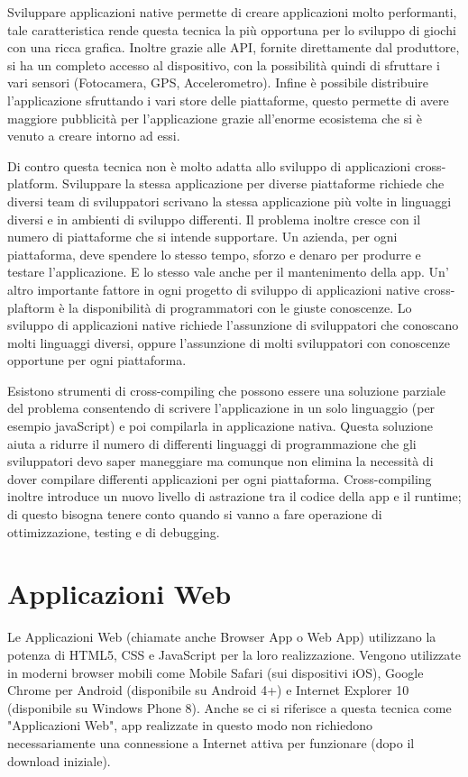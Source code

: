 Sviluppare applicazioni native permette di creare applicazioni molto performanti, tale caratteristica rende questa tecnica la più opportuna per lo sviluppo di giochi con una ricca grafica. Inoltre grazie alle API, fornite direttamente dal produttore, si ha un completo accesso al dispositivo, con la possibilità quindi di sfruttare i vari sensori (Fotocamera, GPS, Accelerometro). Infine è possibile distribuire l'applicazione sfruttando i vari store delle piattaforme, questo permette di avere maggiore pubblicità per l'applicazione grazie all'enorme ecosistema che si è venuto a creare intorno ad essi.

Di contro questa tecnica non è molto adatta allo sviluppo di applicazioni cross-platform. Sviluppare la stessa applicazione per diverse piattaforme richiede che diversi team di sviluppatori scrivano la stessa applicazione più volte in linguaggi diversi e in ambienti di sviluppo differenti.
Il problema inoltre cresce con il numero di piattaforme che si intende supportare. Un azienda, per ogni piattaforma, deve spendere lo stesso tempo, sforzo e denaro per produrre e testare l'applicazione. E lo stesso vale anche per il mantenimento della app.
Un' altro importante fattore in ogni progetto di sviluppo di applicazioni native cross-plaftorm è la disponibilità di programmatori con le giuste conoscenze. Lo sviluppo di applicazioni native richiede l'assunzione di sviluppatori che conoscano molti linguaggi diversi, oppure l'assunzione di molti sviluppatori con conoscenze opportune per ogni piattaforma.
 
Esistono strumenti di cross-compiling che possono essere una soluzione parziale del problema consentendo di scrivere l'applicazione in un solo linguaggio (per esempio javaScript) e poi compilarla in applicazione nativa. Questa soluzione aiuta a ridurre il numero di differenti linguaggi di programmazione che gli sviluppatori devo saper maneggiare ma comunque non elimina la necessità di dover compilare differenti applicazioni per ogni piattaforma. Cross-compiling inoltre introduce un nuovo livello di astrazione tra il codice della app e il runtime; di questo bisogna tenere conto quando si vanno a fare operazione di ottimizzazione, testing e di debugging.

	\section{Applicazioni Web}
		Le Applicazioni Web (chiamate anche Browser App o Web App) utilizzano la potenza di HTML5, CSS e JavaScript per la loro realizzazione. Vengono utilizzate in moderni browser mobili come Mobile Safari (sui dispositivi iOS), Google Chrome per Android (disponibile su Android 4+) e Internet Explorer 10 (disponibile su Windows Phone 8).
Anche se ci si riferisce a questa tecnica come "Applicazioni Web", app realizzate in questo modo non richiedono necessariamente una connessione a Internet attiva per funzionare (dopo il download iniziale). 

